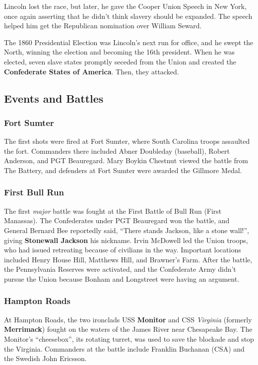 Lincoln lost the race, but later, he gave the Cooper Union Speech in New York,
once again asserting that he didn't think slavery should be expanded.
The speech helped him get the Republican nomination over William Seward.

The 1860 Presidential Election was Lincoln's next run for office, and he swept the North,
winning the election and becoming the 16th president.
When he was elected, seven slave states promptly seceded from the Union
and created the \textbf{Confederate States of America}.
Then, they attacked.


\subsection*{Events and Battles}

\subsubsection*{Fort Sumter}

The first shots were fired at Fort Sumter, where South Carolina troops assaulted the fort.
Commanders there included Abner Doubleday (baseball), Robert Anderson, and PGT Beauregard.
Mary Boykin Chestnut viewed the battle from The Battery,
and defenders at Fort Sumter were awarded the Gillmore Medal.

\subsubsection*{First Bull Run}

The first \textit{major} battle was fought at the First Battle of Bull Run (First Manassas).
The Confederates under PGT Beauregard won the battle,
and General Bernard Bee reportedly said, ``There stands Jackson, like a stone wall!'',
giving \textbf{Stonewall Jackson} his nickname.
Irvin McDowell led the Union troops, who had issued retreating because of civilians in the way.
Important locations included Henry House Hill, Matthews Hill, and Brawner's Farm.
After the battle, the Pennsylvania Reserves were activated,
and the Confederate Army didn't pursue the Union because Bonham and Longstreet were having an argument.

\subsubsection*{Hampton Roads}

At Hampton Roads, the two ironclads USS \textbf{Monitor} and CSS \textit{Virginia} (formerly \textbf{Merrimack})
fought on the waters of the James River near Chesapeake Bay.
The Monitor's ``cheesebox'', its rotating turret, was used to save the blockade and stop the Virginia.
Commanders at the battle include Franklin Buchanan (CSA) and the Swedish John Ericsson.

